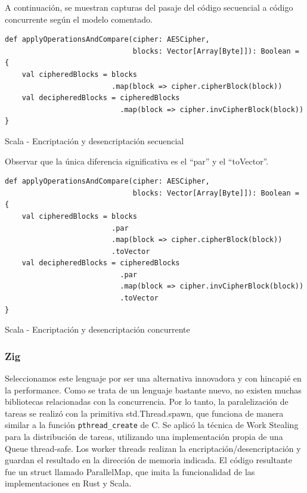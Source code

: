 \documentclass[11pt]{article}
\let\Oldsubsubsection\subsubsection
\renewcommand{\subsubsection}{\FloatBarrier\Oldsubsubsection}
\begin{document}
A continuación, se muestran capturas del pasaje del código secuencial a código concurrente según el modelo comentado.

\begin{listing}[h]
\begin{verbatim}
def applyOperationsAndCompare(cipher: AESCipher,
                              blocks: Vector[Array[Byte]]): Boolean = {
    val cipheredBlocks = blocks
                         .map(block => cipher.cipherBlock(block))
    val decipheredBlocks = cipheredBlocks
                           .map(block => cipher.invCipherBlock(block))
}
\end{verbatim}
\caption{Scala - Encriptación y desencriptación secuencial}
\end{listing}

Observar que la única diferencia significativa es el “par” y el “toVector”.

\begin{listing}[h]
\begin{verbatim}
def applyOperationsAndCompare(cipher: AESCipher,
                              blocks: Vector[Array[Byte]]): Boolean = {
    val cipheredBlocks = blocks
                         .par
                         .map(block => cipher.cipherBlock(block))
                         .toVector
    val decipheredBlocks = cipheredBlocks
                           .par
                           .map(block => cipher.invCipherBlock(block))
                           .toVector
}
\end{verbatim}
\caption{Scala - Encriptación y desencriptación concurrente}
\end{listing}

\subsubsection{Zig}

Seleccionamos este lenguaje por ser una alternativa innovadora y con hincapié en la performance. 
Como se trata de un lenguaje bastante nuevo, no existen muchas bibliotecas relacionadas con la concurrencia. Por lo tanto, la paralelización de tareas se realizó con la primitiva std.Thread.spawn, que funciona de manera similar a la función \texttt{pthread_create} de C. Se aplicó la técnica de Work Stealing para la distribución de tareas, utilizando una implementación propia de una Queue thread-safe. Los worker threads realizan la encriptación/desencriptación y guardan el resultado en la dirección de memoria indicada. El código resultante fue un struct llamado ParallelMap, que imita la funcionalidad de las implementaciones en Rust y Scala.
\end{document}
